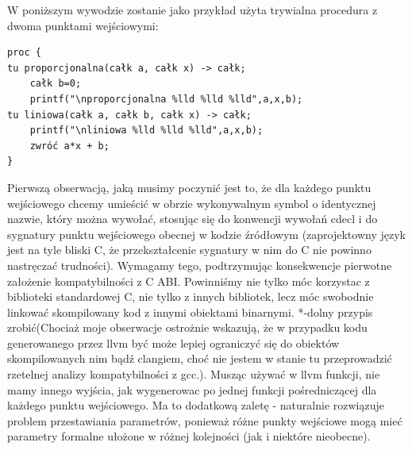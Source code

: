 W poniższym wywodzie zostanie jako przykład użyta trywialna procedura z dwoma punktami wejściowymi:
\begin{lstlisting}
proc {
tu proporcjonalna(całk a, całk x) -> całk;
	całk b=0;
	printf("\nproporcjonalna %lld %lld %lld",a,x,b);
tu liniowa(całk a, całk b, całk x) -> całk;
	printf("\nliniowa %lld %lld %lld",a,x,b);
	zwróć a*x + b;
}
\end{lstlisting}

Pierwszą obserwacją, jaką musimy poczynić jest to, że dla każdego punktu wejściowego chcemy umieścić w obrzie wykonywalnym symbol o identycznej nazwie, który można wywołać, stosując się do konwencji wywołań cdecl i do sygnatury punktu wejściowego obecnej w kodzie źródłowym (zaprojektowny język jest na tyle bliski C, że przekształcenie sygnatury w nim do C nie powinno nastręczać trudności). Wymagamy tego, podtrzymując konsekwencje pierwotne założenie kompatybilności z C ABI. Powinniśmy nie tylko móc korzystac z biblioteki standardowej C, nie tylko z innych bibliotek, lecz móc swobodnie linkować skompilowany kod z innymi obiektami binarnymi. *-dolny przypis zrobić(Chociaż moje obserwacje ostrożnie wskazują, że w przypadku kodu generowanego przez llvm być może lepiej ograniczyć się do obiektów skompilowanych nim bądź clangiem, choć nie jestem w stanie tu przeprowadzić rzetelnej analizy kompatybilności z gcc.). Musząc używać w llvm funkcji, nie mamy innego wyjścia, jak wygenerowac po jednej funkcji pośredniczącej dla każdego punktu wejściowego. Ma to dodatkową zaletę - naturalnie rozwiązuje problem przestawiania parametrów, ponieważ różne punkty wejściowe mogą mieć parametry formalne ułożone w różnej kolejności (jak i niektóre nieobecne).

